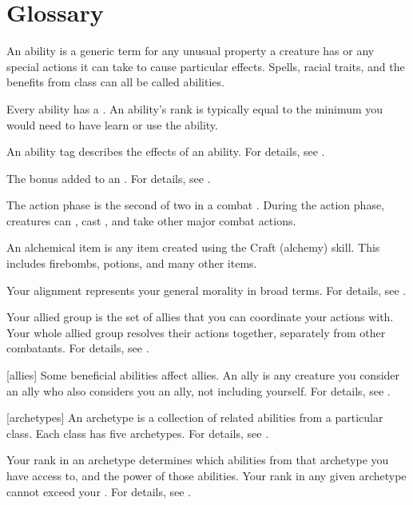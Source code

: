 \chapter{Glossary}\label{Glossary}

 An ability is a generic term for any unusual property a creature has or any special actions it can take to cause particular effects.
Spells, racial traits, and the benefits from class  can all be called abilities.

 Every ability has a .
An ability's rank is typically equal to the minimum  you would need to have learn or use the ability.

 An ability tag describes the effects of an ability.
For details, see .

 The bonus added to an .
For details, see .

 The action phase is the second of two  in a combat .
During the action phase, creatures can , cast , and take other major combat actions.

 An alchemical item is any item created using the Craft (alchemy) skill.
This includes firebombs, potions, and many other items.

 Your alignment represents your general morality in broad terms.
For details, see .

 Your allied group is the set of allies that you can coordinate your actions with.
Your whole allied group resolves their actions together, separately from other combatants.
For details, see .

[allies] Some beneficial abilities affect allies.
An ally is any creature you consider an ally who also considers you an ally, not including yourself.
For details, see .

[archetypes] An archetype is a collection of related abilities from a particular class.
Each class has five archetypes.
For details, see .

 Your rank in an archetype determines which abilities from that archetype you have access to, and the power of those abilities.
Your rank in any given archetype cannot exceed your .
For details, see .


